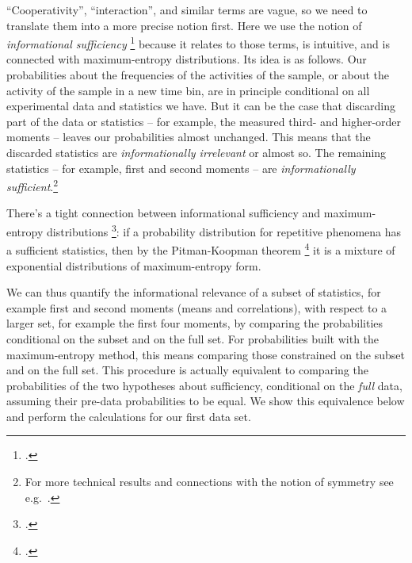 \documentclass[\ifafour a4paper,12pt,\else a5paper,10pt,\fi%
onecolumn,oneside,article,%
british%
]{memoir}
\theoremstyle{remark}
\theoremstyle{innote}
\newcommand*{\citep}{\footcites}
\newcommand*{\amp}{\&}
\renewcommand*{\|}{\nonscript\,\vert\nonscript\;\mathopen{}}
\newcommand*{\sect}{\S}%
\newcommand*{\chap}{ch.}%
\newcommand*{\eg}{{e.g.}}
\begin{document}
\enquote{Cooperativity}, \enquote{interaction}, and similar terms are
vague, so we need to translate them into a more precise notion first. Here
we use the notion of \emph{informational sufficiency}
\citep[\sect~4.5]{bernardoetal1994}[\chap~8 \amp\
\sect~14.2]{jaynes1994_r2003}{cifarellietal1982,kullbacketal1951}[the
notion goes back to][]{fisher1922} because it relates to those terms, is
intuitive, and is connected with maximum-entropy distributions. Its idea is
as follows. Our probabilities about the frequencies of the activities of
the sample, or about the activity of the sample in a new time bin, are in
principle conditional on all experimental data and statistics we have. But
it can be the case that discarding part of the data or statistics -- for
example, the measured third- and higher-order moments -- leaves our
probabilities almost unchanged. This means that the discarded statistics
are \emph{informationally irrelevant} or almost so. The remaining
statistics -- for example, first and second moments -- are
\emph{informationally sufficient}.\footnote{For more technical results
  and connections with the notion of symmetry see \eg\
  \cite{darmois1935,neyman1935,koopman1936,pitman1936,halmosetal1949,bahadur1954,berk1972,lauritzen1974,lauritzen1982_r1988,lauritzen2007,cifarellietal1980,cifarellietal1981,diaconisetal1981,diaconis1992,furmanczyketal1998,fortinietal2000,nogalesetal2000,kallenberg2005,ayetal2015}.}

There's a tight connection between informational sufficiency and
maximum-entropy distributions
\citep{jaynes1982b}[\sect~4.5.4]{bernardoetal1994}: if a probability
distribution for repetitive phenomena has a sufficient statistics, then by
the Pitman-Koopman theorem \citep{koopman1936,pitman1936,darmois1935}[for
later analyses and the discrete case
see][]{hipp1974,andersen1970,denny1967,denny1972,fraser1963,barankinetal1963,barndorffnielsen1978_r2014}
it is a mixture of exponential distributions of maximum-entropy form.



We can thus quantify the informational relevance of a subset of statistics,
for example first and second moments (means and correlations), with respect
to a larger set, for example the first four moments, by comparing the
probabilities conditional on the subset and on the full set. For
probabilities built with the maximum-entropy method, this means comparing
those constrained on the subset and on the full set. This procedure is
actually equivalent to comparing the probabilities of the two hypotheses
about sufficiency, conditional on the \emph{full} data, assuming their
pre-data probabilities to be equal. We show this equivalence below and
perform the calculations for our first data set.
\medskip
\end{document}
